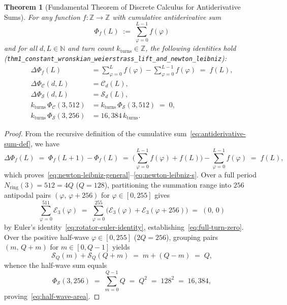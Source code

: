 \documentclass[11pt,a4paper]{article}
\theoremstyle{plain}
\newtheorem{theorem}{Theorem}[section]
\theoremstyle{definition}
\begin{document}
\begin{theorem}[Fundamental Theorem of Discrete Calculus for Antiderivative Sums]
\label{thm:main-1c}
For any function $f\colon \mathbb{Z} \to \mathbb{Z}$ with cumulative antiderivative sum
\begin{equation}
  \label{eq:antiderivative-sum-def}
  \Phi_f(L) \;:=\; \sum_{\varphi=0}^{L-1} f(\varphi)
\end{equation}
and for all $d, L \in \mathbb{N}$ and turn count $k_{\mathrm{turns}} \in \mathbb{Z}$, the following identities hold (\texttt{thm1\_constant\_wronskian\_weierstrass\_lift\_and\_newton\_leibniz}):
\begin{align}
  \Delta\Phi_f(L) &= \sum_{\varphi=0}^{L} f(\varphi) - \sum_{\varphi=0}^{L-1} f(\varphi) \;=\; f(L), \label{eq:newton-leibniz-general} \\
  \Delta\Phi_{\mathcal{C}}(d, L) &= \mathcal{C}_d(L), \label{eq:newton-leibniz-c} \\
  \Delta\Phi_{\mathcal{S}}(d, L) &= \mathcal{S}_d(L), \label{eq:newton-leibniz-s} \\
  k_{\mathrm{turns}}\,\Phi_{\mathcal{C}}(3, 512) &= k_{\mathrm{turns}}\,\Phi_{\mathcal{S}}(3, 512) \;=\; 0, \label{eq:full-turn-zero} \\
  k_{\mathrm{turns}}\,\Phi_{\mathcal{S}}(3, 256) &= 16,384\,k_{\mathrm{turns}}. \label{eq:half-wave-area}
\end{align}
\end{theorem}

\begin{proof}
From the recursive definition of the cumulative sum~\eqref{eq:antiderivative-sum-def}, we have
\begin{equation*}
  \Delta\Phi_f(L) \;=\; \Phi_f(L + 1) - \Phi_f(L) \;=\; \biggl(\sum_{\varphi=0}^{L-1} f(\varphi) + f(L)\biggr) - \sum_{\varphi=0}^{L-1} f(\varphi) \;=\; f(L),
\end{equation*}
which proves~\eqref{eq:newton-leibniz-general}--\eqref{eq:newton-leibniz-s}. Over a full period $N_{\mathrm{ring}}(3) = 512 = 4Q$ ($Q = 128$), partitioning the summation range into $256$ antipodal pairs $(\varphi,\, \varphi + 256)$ for $\varphi \in [0, 255]$ gives
\begin{equation*}
  \sum_{\varphi=0}^{511} \mathcal{E}_3(\varphi) \;=\; \sum_{\varphi=0}^{255} \bigl(\mathcal{E}_3(\varphi) + \mathcal{E}_3(\varphi + 256)\bigr) \;=\; (0,\, 0)
\end{equation*}
by Euler's identity~\eqref{eq:rotator-euler-identity}, establishing~\eqref{eq:full-turn-zero}. Over the positive half-wave $\varphi \in [0, 255]$ ($2Q = 256$), grouping pairs $(m,\, Q + m)$ for $m \in [0, Q - 1]$ yields
\begin{equation*}
  \mathcal{S}_Q(m) + \mathcal{S}_Q(Q + m) \;=\; m + (Q - m) \;=\; Q,
\end{equation*}
whence the half-wave sum equals
\begin{equation*}
  \Phi_{\mathcal{S}}(3, 256) \;=\; \sum_{m=0}^{Q-1} Q \;=\; Q^2 \;=\; 128^2 \;=\; 16,384,
\end{equation*}
proving~\eqref{eq:half-wave-area}.
\end{proof}
\end{document}
